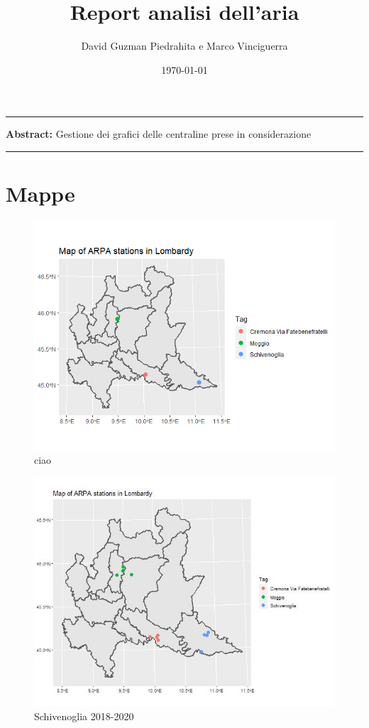 \documentclass{article}
\title{Report analisi dell'aria}
\author{David Guzman Piedrahita e Marco Vinciguerra}
\date{\today}
\begin{document}
\maketitle

\par\noindent\rule{\textwidth}{0.4pt}
\textbf{Abstract:} Gestione dei grafici delle centraline prese in considerazione
\par\noindent\rule{\textwidth}{0.4pt}
\section{Mappe}
\begin{figure}[H]
  \centering
  \includegraphics[scale = 0.7]{Picture/AQStationsOfInterest.jpeg}
  \caption{ciao}
\end{figure}
\begin{figure}[H]
  \centering
  \includegraphics[scale = 0.4]{Picture/WStationsOfInterestConstrained.jpeg}
  \caption{Schivenoglia 2018-2020}
\end{figure}
\end{document}
